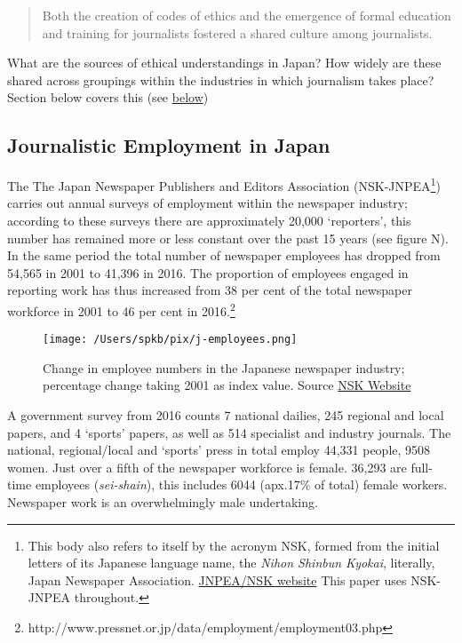 \documentclass[11pt, headings=normal]{scrartcl}
\begin{document}
\begin{quote}
Both the creation of codes of ethics and the emergence of formal
education and training for journalists fostered a shared culture among
journalists. \autocite[ 66]{Tumber:2005}
\end{quote}

What are the sources of ethical understandings in Japan? How widely are
these shared across groupings within the industries in which journalism
takes place? Section below covers this (see
\protect\hyperlink{ethics}{below})

\hypertarget{journalistic-employment-in-japan}{%
\subsection{Journalistic Employment in
Japan}\label{journalistic-employment-in-japan}}

The The Japan Newspaper Publishers and Editors Association
(NSK-JNPEA\footnote{This body also refers to itself by the acronym NSK,
  formed from the initial letters of its Japanese language name, the
  \emph{Nihon Shinbun Kyokai}, literally, Japan Newspaper Association.
  \href{http://www.pressnet.or.jp/english/}{JNPEA/NSK website} This
  paper uses NSK-JNPEA throughout.}) carries out annual surveys of
employment within the newspaper industry; according to these surveys
there are approximately 20,000 `reporters', this number has remained
more or less constant over the past 15 years (see figure N). In the same
period the total number of newspaper employees has dropped from 54,565
in 2001 to 41,396 in 2016. The proportion of employees engaged in
reporting work has thus increased from 38 per cent of the total
newspaper workforce in 2001 to 46 per cent in 2016.\footnote{http://www.pressnet.or.jp/data/employment/employment03.php}

\begin{figure}
\centering
\texttt{[image: /Users/spkb/pix/j-employees.png]}
\caption{Change in employee numbers in the Japanese newspaper industry;
percentage change taking 2001 as index value. Source
\href{http://www.pressnet.or.jp/data/employment/employment02.php}{NSK
Website}}
\end{figure}

A government survey from 2016 counts 7 national dailies, 245 regional
and local papers, and 4 `sports' papers, as well as 514 specialist and
industry journals. The national, regional/local and `sports' press in
total employ 44,331 people, 9508 women. Just over a fifth of the
newspaper workforce is female. 36,293 are full-time employees
(\emph{sei-shain}), this includes 6044 (apx.17\% of total) female
workers. Newspaper work is an overwhelmingly male undertaking.
\end{document}
